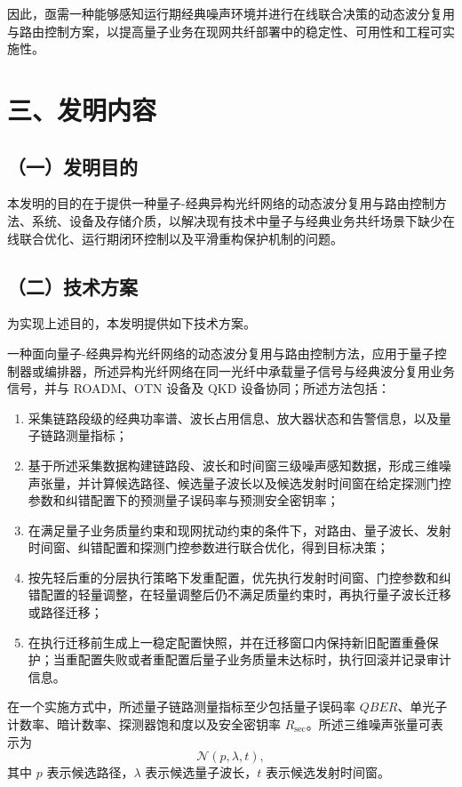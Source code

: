 \documentclass[12pt,a4paper]{article}
\begin{document}
因此，亟需一种能够感知运行期经典噪声环境并进行在线联合决策的动态波分复用与路由控制方案，以提高量子业务在现网共纤部署中的稳定性、可用性和工程可实施性。

\section*{三、发明内容}

\subsection*{（一）发明目的}

本发明的目的在于提供一种量子-经典异构光纤网络的动态波分复用与路由控制方法、系统、设备及存储介质，以解决现有技术中量子与经典业务共纤场景下缺少在线联合优化、运行期闭环控制以及平滑重构保护机制的问题。

\subsection*{（二）技术方案}

为实现上述目的，本发明提供如下技术方案。

一种面向量子-经典异构光纤网络的动态波分复用与路由控制方法，应用于量子控制器或编排器，所述异构光纤网络在同一光纤中承载量子信号与经典波分复用业务信号，并与 ROADM、OTN 设备及 QKD 设备协同；所述方法包括：
\begin{enumerate}[leftmargin=2em]
    \item 采集链路段级的经典功率谱、波长占用信息、放大器状态和告警信息，以及量子链路测量指标；
    \item 基于所述采集数据构建链路段、波长和时间窗三级噪声感知数据，形成三维噪声张量，并计算候选路径、候选量子波长以及候选发射时间窗在给定探测门控参数和纠错配置下的预测量子误码率与预测安全密钥率；
    \item 在满足量子业务质量约束和现网扰动约束的条件下，对路由、量子波长、发射时间窗、纠错配置和探测门控参数进行联合优化，得到目标决策；
    \item 按先轻后重的分层执行策略下发重配置，优先执行发射时间窗、门控参数和纠错配置的轻量调整，在轻量调整后仍不满足质量约束时，再执行量子波长迁移或路径迁移；
    \item 在执行迁移前生成上一稳定配置快照，并在迁移窗口内保持新旧配置重叠保护；当重配置失败或者重配置后量子业务质量未达标时，执行回滚并记录审计信息。
\end{enumerate}

在一个实施方式中，所述量子链路测量指标至少包括量子误码率 $QBER$、单光子计数率、暗计数率、探测器饱和度以及安全密钥率 $R_{\mathrm{sec}}$。所述三维噪声张量可表示为
\[
\mathcal{N}(p,\lambda,t),
\]
其中 $p$ 表示候选路径，$\lambda$ 表示候选量子波长，$t$ 表示候选发射时间窗。
\end{document}
